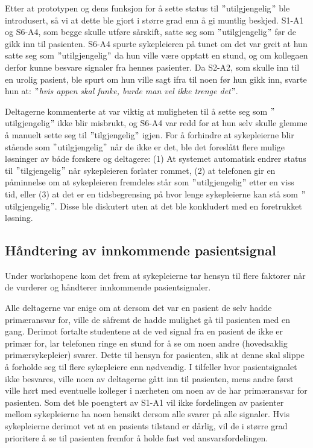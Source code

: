 \noindent
Etter at prototypen og dens funksjon for å sette status til $"$utilgjengelig$"$ ble introdusert, så vi at dette ble gjort i større grad enn å gi muntlig beskjed. S1-A1 og S6-A4, som begge skulle utføre sårskift, satte seg som $"$utilgjengelig$"$ før de gikk inn til pasienten. S6-A4 spurte sykepleieren på tunet om det var greit at hun satte seg som $"$utilgjengelig$"$ da hun ville være opptatt en stund, og om kollegaen derfor kunne besvare signaler fra hennes pasienter. Da S2-A2, som skulle inn til en urolig pasient, ble spurt om hun ville sagt ifra til noen før hun gikk inn, svarte hun at: \emph{$"$hvis appen skal funke, burde man vel ikke trenge det$"$}.

\noindent
Deltagerne kommenterte at var viktig at muligheten til å sette seg som $"$utilgjengelig$"$ ikke blir misbrukt, og S6-A4 var redd for at hun selv skulle glemme å manuelt sette seg til $"$tilgjengelig$"$ igjen. For å forhindre at sykepleierne blir stående som $"$utilgjengelig$"$ når de ikke er det, ble det foreslått flere mulige løsninger av både forskere og deltagere: (1) At systemet automatisk endrer status til $"$tilgjengelig$"$ når sykepleieren forlater rommet, (2) at telefonen gir en påminnelse om at sykepleieren fremdeles står som $"$utilgjengelig$"$ etter en viss tid, eller (3) at det er en tidsbegrensing på hvor lenge sykepleierne kan stå som $"$utilgjengelig$"$. Disse ble diskutert uten at det ble konkludert med en foretrukket løsning.

\subsection{Håndtering av innkommende pasientsignal}
Under workshopene kom det frem at sykepleierne tar hensyn til flere faktorer når de vurderer og håndterer innkommende pasientsignaler. 

\noindent
Alle deltagerne var enige om at dersom det var en pasient de selv hadde primæransvar for, ville de såfremt de hadde mulighet gå til pasienten med en gang. Derimot fortalte studentene at de ved signal fra en pasient de ikke er primær for, lar telefonen ringe en stund for å se om noen andre (hovedsaklig primærsykepleier) svarer. Dette til hensyn for pasienten, slik at denne skal slippe å forholde seg til flere sykepleiere enn nødvendig. I tilfeller hvor pasientsignalet ikke besvares, ville noen av deltagerne gått inn til pasienten, mens andre først ville hørt med eventuelle kolleger i nærheten om noen av de har primæransvar for pasienten. Som det ble poengtert av S1-A1 vil ikke fordelingen av pasienter mellom sykepleierne ha noen hensikt dersom alle svarer på alle signaler. Hvis sykepleierne derimot vet at en pasients tilstand er dårlig, vil de i større grad prioritere å se til pasienten fremfor å holde fast ved ansvarsfordelingen.

